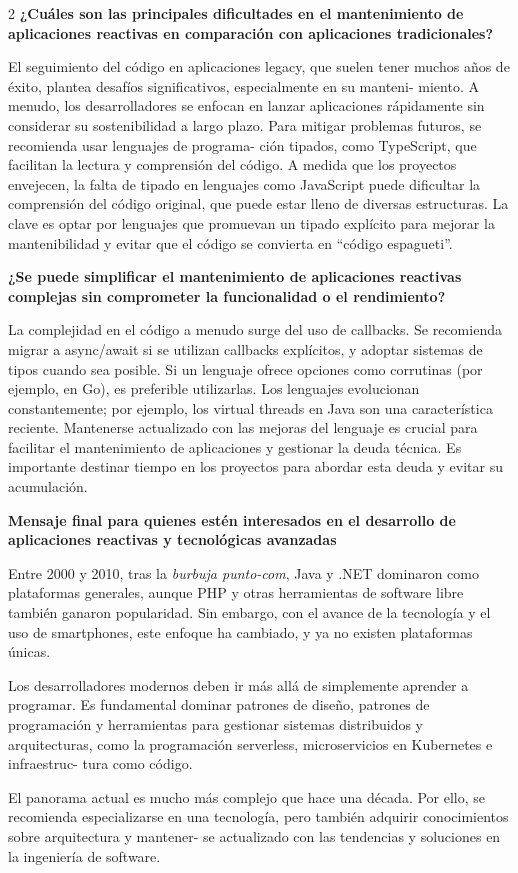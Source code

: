 \documentclass[12pt,spanish,Letterpaper,openany]{book}
\begin{document}
\begin {multicols}{2}
\textbf{¿Cuáles son las principales dificultades en el mantenimiento de aplicaciones reactivas en comparación con aplicaciones tradicionales?}

El seguimiento del código en aplicaciones legacy, que suelen tener muchos años de éxito, plantea desafíos significativos, especialmente en su manteni-
miento. A menudo, los desarrolladores se enfocan en lanzar aplicaciones rápidamente sin considerar su sostenibilidad a largo plazo. Para mitigar problemas futuros, se recomienda usar lenguajes de programa-
ción tipados, como TypeScript, que facilitan la lectura y comprensión del código. A medida que los proyectos envejecen, la falta de tipado en lenguajes como JavaScript puede dificultar la comprensión del código original, que puede estar lleno de diversas estructuras. La clave es optar por lenguajes que promuevan un tipado explícito para mejorar la mantenibilidad y evitar que el código se convierta en ``código espagueti''.

\textbf{¿Se puede simplificar el mantenimiento de aplicaciones reactivas complejas sin comprometer la funcionalidad o el rendimiento?}

La complejidad en el código a menudo surge del uso de callbacks. Se recomienda migrar a async/await si se utilizan callbacks explícitos, y adoptar sistemas de tipos cuando sea posible. Si un lenguaje ofrece opciones como corrutinas (por ejemplo, en Go), es preferible utilizarlas. Los lenguajes evolucionan constantemente; por ejemplo, los virtual threads en Java son una característica reciente. Mantenerse actualizado con las mejoras del lenguaje es crucial para facilitar el mantenimiento de aplicaciones y gestionar la deuda técnica. Es importante destinar tiempo en los proyectos para abordar esta deuda y evitar su acumulación.

\textbf{Mensaje final para quienes estén interesados en el desarrollo de aplicaciones reactivas y tecnológicas avanzadas}

Entre 2000 y 2010, tras la \emph{burbuja punto-com}, Java y .NET dominaron como plataformas generales, aunque PHP y otras herramientas de software libre también ganaron popularidad. Sin embargo, con el avance de la tecnología y el uso de smartphones, este enfoque ha cambiado, y ya no existen plataformas únicas.

Los desarrolladores modernos deben ir más allá de simplemente aprender a programar. Es fundamental dominar patrones de diseño, patrones de programación y herramientas para gestionar sistemas distribuidos y arquitecturas, como la programación serverless, microservicios en Kubernetes e infraestruc-
tura como código.

El panorama actual es mucho más complejo que hace una década. Por ello, se recomienda especializarse en una tecnología, pero también adquirir conocimientos sobre arquitectura y mantener-
se actualizado con las tendencias y soluciones en la ingeniería de software.

\end {multicols}
\end{document}
